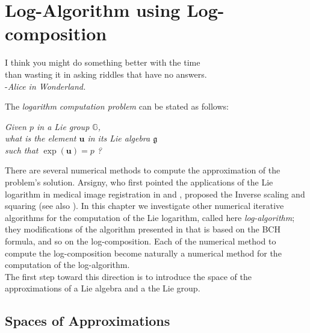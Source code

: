 \chapter{Log-Algorithm using Log-composition}\label{ch:log_algorithm}

\begin{flushright}
	I think you might do something better with the time \\ than wasting it in asking riddles that have no answers. \\ -\emph{Alice in Wonderland.}
\end{flushright}

\vspace{0.5 cm}

\noindent
The \emph{logarithm computation problem} can be stated as follows:
\begin{center}
\emph{
	Given $p$ in a Lie group $\mathbb{G}$, \\ 
	what is the element $\mathbf{u}$ in its Lie algebra $\mathfrak{g}$ \\
	such that $\exp(\mathbf{u}) = p$ ?  
}
\end{center}
There are several numerical methods to compute the approximation of the problem's solution. Arsigny, who first pointed the applications of the Lie logarithm in medical image registration in \cite{Arsigny:MRM:06} and \cite{arsigny2006bi}, proposed the Inverse scaling and squaring (see also \cite{ying2006phase}). In this chapter we investigate other numerical iterative algorithms for the computation of the Lie logarithm, called here \emph{log-algorithm}; they modifications of the algorithm presented in \cite{Bossa:08} that is based on the BCH formula, and so on the log-composition. Each of the numerical method to compute the log-composition become naturally a numerical method for the computation of the log-algorithm.\\
The first step toward this direction is to introduce the space of the approximations of a Lie algebra and a the Lie group.


\section{Spaces of Approximations}\label{se:space_of_approximation}

